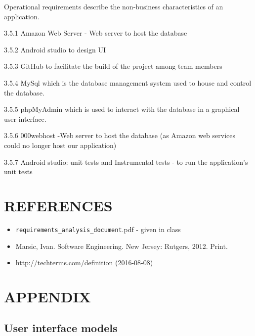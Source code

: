 \documentclass[12pt]{article}
\begin{document}
Operational requirements describe the non-business characteristics of an application.\\
\begin{flushleft}
3.5.1 Amazon Web Server - Web server to host the database
\end{flushleft}
\begin{flushleft}
3.5.2 Android studio to design UI
\end{flushleft}
\begin{flushleft}
3.5.3 GitHub to facilitate the build of the project among team members
\end{flushleft}
\begin{flushleft}
3.5.4 MySql which is the database management system used to house and control the database.
\end{flushleft}
\begin{flushleft}
3.5.5 phpMyAdmin which is used to interact with the database in a graphical user interface.
\end{flushleft}
\begin{flushleft}
3.5.6 000webhost -Web server to host the database (as Amazon web services could no longer host our application)
\end{flushleft}
\begin{flushleft}
3.5.7 Android studio: unit tests and Instrumental tests  - to run the application's unit tests
\end{flushleft}


\newpage
\section{REFERENCES}
\begin{itemize}
\item \texttt{requirements\_analysis\_document}.pdf - given in class
\item Marsic, Ivan. Software Engineering. New Jersey: Rutgers, 2012. Print.
\item http://techterms.com/definition (2016-08-08)
\end{itemize}
\newpage
\section{APPENDIX}
\subsection{User interface models}
\end{document}

